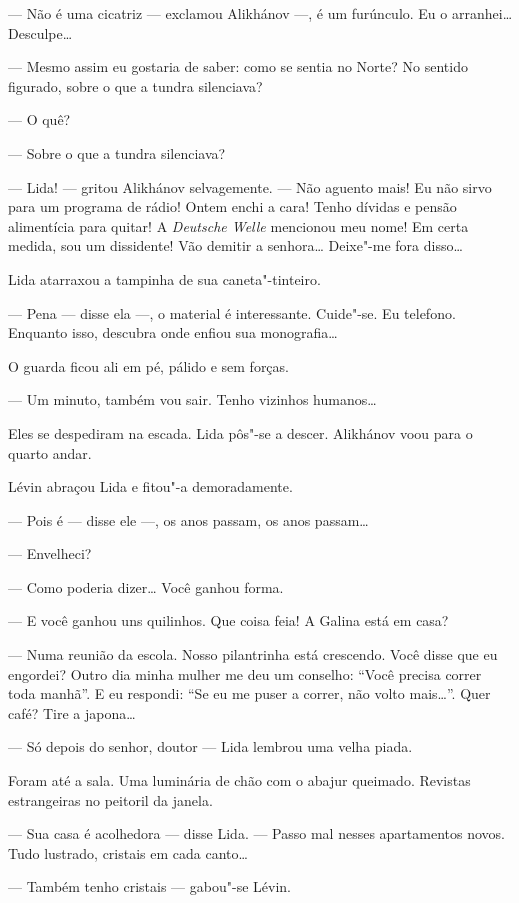 --- Não é uma cicatriz --- exclamou Alikhánov ---, é um furúnculo. Eu o
arranhei\ldots{} Desculpe\ldots{}

--- Mesmo assim eu gostaria de saber: como se sentia no Norte? No
sentido figurado, sobre o que a tundra silenciava?

--- O quê?

--- Sobre o que a tundra silenciava?

--- Lida! --- gritou Alikhánov selvagemente. --- Não aguento mais! Eu
não sirvo para um programa de rádio! Ontem enchi a cara! Tenho dívidas e
pensão alimentícia para quitar! A \emph{Deutsche Welle} mencionou meu
nome! Em certa medida, sou um dissidente! Vão demitir a senhora\ldots{}
Deixe"-me fora disso\ldots{}

Lida atarraxou a tampinha de sua caneta"-tinteiro.

--- Pena --- disse ela ---, o material é interessante. Cuide"-se. Eu
telefono. Enquanto isso, descubra onde enfiou sua monografia\ldots{}

O guarda ficou ali em pé, pálido e sem forças.

--- Um minuto, também vou sair. Tenho vizinhos humanos\ldots{}

Eles se despediram na escada. Lida pôs"-se a descer. Alikhánov voou para
o quarto andar.

Lévin abraçou Lida e fitou"-a demoradamente.

--- Pois é --- disse ele ---, os anos passam, os anos passam\ldots{}

--- Envelheci?

--- Como poderia dizer\ldots{} Você ganhou forma.

--- E você ganhou uns quilinhos. Que coisa feia! A Galina está em casa?

--- Numa reunião da escola. Nosso pilantrinha está crescendo. Você disse
que eu engordei? Outro dia minha mulher me deu um conselho: ``Você
precisa correr toda manhã''. E eu respondi: ``Se eu me puser a correr,
não volto mais\ldots{}''. Quer café? Tire a japona\ldots{}

--- Só depois do senhor, doutor --- Lida lembrou uma velha piada.

Foram até a sala. Uma luminária de chão com o abajur queimado. Revistas
estrangeiras no peitoril da janela.

--- Sua casa é acolhedora --- disse Lida. --- Passo mal nesses
apartamentos novos. Tudo lustrado, cristais em cada canto\ldots{}

--- Também tenho cristais --- gabou"-se Lévin.

